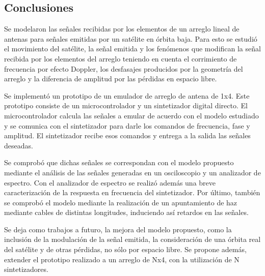 \documentclass{article}
\newenvironment{standalone}{\begin{preview}}{\end{preview}}
\begin{document}
\begin{standalone}
  \section{Conclusiones}

  Se modelaron las señales recibidas por los elementos de un arreglo lineal de antenas para señales emitidas por un satélite en órbita baja.
  Para esto se estudió el movimiento del satélite, la señal emitida y los fenómenos que modifican la señal recibida por los elementos del arreglo teniendo en cuenta el corrimiento de frecuencia por efecto Doppler, los desfasajes producidos por la geometría del arreglo y la diferencia de amplitud por las pérdidas en espacio libre.

  Se implementó un prototipo de un emulador de arreglo de antena de 1x4.
  Este prototipo consiste de un microcontrolador y un sintetizador digital directo.
  El microcontrolador calcula las señales a emular de acuerdo con el modelo estudiado y se comunica con el sintetizador para darle los comandos de frecuencia, fase y amplitud.
  El sintetizador recibe esos comandos y entrega a la salida las señales deseadas.

  Se comprobó que dichas señales se correspondan con el modelo propuesto mediante el análisis de las señales generadas en un osciloscopio y un analizador de espectro.
  Con el analizador de espectro se realizó además una breve caracterización de la respuesta en frecuencia del sintetizador.
  Por último, también se comprobó el modelo mediante la realización de un apuntamiento de haz mediante cables de distintas longitudes, induciendo así retardos en las señales.

  Se deja como trabajos a futuro, la mejora del modelo propuesto, como la inclusión de la modulación de la señal emitida, la consideración de una órbita real del satélite y de otras pérdidas, no sólo por espacio libre.
  Se propone además, extender el prototipo realizado a un arreglo de Nx4, con la utilización de N sintetizadores.

\end{standalone}
\end{document}
